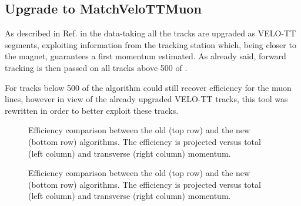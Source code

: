 \subsection{Upgrade to MatchVeloTTMuon }
\label{sec:matchvelottmuon}

As described in Ref.\cite{LHCb-PUB-2015-005} in the \runtwo data-taking all the tracks are upgraded as VELO-TT segments,
exploiting information from the \ttracker tracking station which, being closer to the magnet,
guarantees a first momentum estimated. As already said, forward tracking is then passed on
all tracks above 500 \mevc of \pt.

For tracks below 500 \mevc of \pt the \mvm algorithm could still recover efficiency for the muon lines,
however in view of the already upgraded VELO-TT tracks, this tool was rewritten in order to better exploit these tracks.


\begin{figure}[h]
  \centering
  \begin{subfigure}{0.5\textwidth}
    \scalebox{.6}{}
    \caption{}
    \label{mvTTm_eff_p}
  \end{subfigure}%
  \hfill%
  \begin{subfigure}{0.5\textwidth}
    \scalebox{.6}{}
    \caption{}
    \label{mvm_eff_p}
  \end{subfigure}
  \caption{Efficiency comparison between the old \mvm (top row) and the new \mvTTm (bottom row) algorithms.
 The efficiency is projected versus total (left column) and transverse (right column) momentum.  }
 \label{mvm_eff_p_comp}
\end{figure}

\begin{figure}[h]
  \centering
  \begin{subfigure}{0.5\textwidth}
    \scalebox{.6}{}
    \caption{}
    \label{mvTTm_eff_p}
  \end{subfigure}%
  \hfill%
  \begin{subfigure}{0.5\textwidth}
    \scalebox{.6}{}
    \caption{}
    \label{mvm_eff_p}
  \end{subfigure}
  \caption{Efficiency comparison between the old \mvm (top row) and the new \mvTTm (bottom row) algorithms.
 The efficiency is projected versus total (left column) and transverse (right column) momentum.  }
 \label{mvm_eff_p_comp}
\end{figure}

